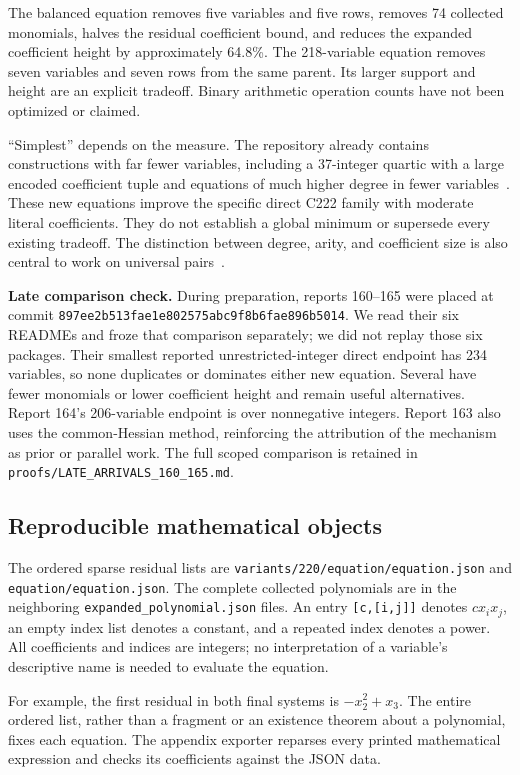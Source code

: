 \documentclass[10pt,letterpaper]{article}
\theoremstyle{definition}\newtheorem{definition}[theorem]{Definition}
\begin{document}
The balanced equation removes five variables and five rows, removes
74 collected monomials, halves the residual coefficient bound, and reduces
the expanded coefficient height by approximately 64.8\%. The 218-variable
equation removes seven variables and seven rows from the same parent.
Its larger support and height are an explicit tradeoff. Binary arithmetic
operation counts have not been optimized or claimed.

``Simplest'' depends on the measure. The repository already contains
constructions with far fewer variables, including a 37-integer quartic
with a large encoded coefficient tuple and equations of much higher degree
in fewer variables~\cite{collection}. These new equations improve the
specific direct C222 family with moderate literal coefficients. They do
not establish a global minimum or supersede every existing tradeoff.
The distinction between degree, arity, and coefficient size is also central
to work on universal pairs~\cite{bayer2026}.

\textbf{Late comparison check.} During preparation, reports 160--165 were
placed at commit \nolinkurl{897ee2b513fae1e802575abc9f8b6fae896b5014}. We read their
six READMEs and froze that comparison separately; we did not replay those
six packages. Their smallest reported unrestricted-integer direct endpoint
has 234 variables, so none duplicates or dominates either new equation.
Several have fewer monomials or lower coefficient height and remain useful
alternatives. Report 164's 206-variable endpoint is over nonnegative
integers. Report 163 also uses the common-Hessian method, reinforcing the
attribution of the mechanism as prior or parallel work. The full scoped
comparison is retained in \nolinkurl{proofs/LATE_ARRIVALS_160_165.md}.

\subsection{Reproducible mathematical objects}
The ordered sparse residual lists are \texttt{variants/220/equation/equation.json}
and \texttt{equation/equation.json}. The complete collected polynomials are
in the neighboring \texttt{expanded\_polynomial.json} files. An entry
\texttt{[c,[i,j]]} denotes $c x_i x_j$, an empty index list denotes a
constant, and a repeated index denotes a power. All coefficients and indices
are integers; no interpretation of a variable's descriptive name is needed
to evaluate the equation.

For example, the first residual in both final systems is
$-x_2^2+x_3$. The entire ordered list, rather than a fragment or an
existence theorem about a polynomial, fixes each equation. The appendix
exporter reparses every printed mathematical expression and checks its
coefficients against the JSON data.
\end{document}
